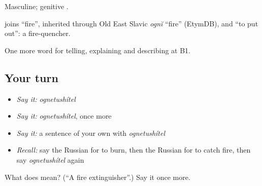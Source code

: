 Masculine; genitive \emph{}.

\begin{cousinweb}
\emph{} joins \emph{} \textquotedblleft{}fire\textquotedblright{}, inherited through Old East Slavic \emph{ognĭ} \textquotedblleft{}fire\textquotedblright{} (EtymDB), and \emph{} \textquotedblleft{}to put out\textquotedblright{}: a fire-quencher.
\end{cousinweb}

\begin{grammarlens}[title={What you've built}]
One more word for telling, explaining and describing at B1.
\end{grammarlens}

\subsection*{Your turn}
\begin{itemize}
\raggedright
  \item \emph{Say it:} \emph{ognetushítel}
  \item \emph{Say it:} \emph{ognetushítel}, once more
  \item \emph{Say it:} a sentence of your own with \emph{ognetushítel}
  \item \emph{Recall:} say the Russian for to burn, then the Russian for to catch fire, then say \emph{ognetushítel} again
\end{itemize}

\begin{tcolorbox}[breakable,colback=teal!4,colframe=teal!35!black,title={Before you move on}]
What does  mean? (\textquotedblleft{}A fire extinguisher\textquotedblright{}.) Say it once more.
\end{tcolorbox}

